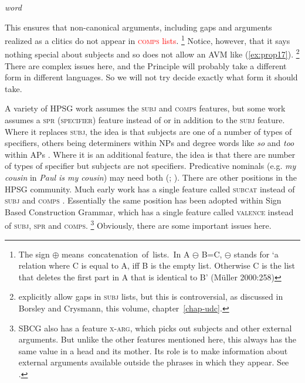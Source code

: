 \documentclass[output=paper
	        ,collection
	        ,collectionchapter
 	        ,biblatex
                ,babelshorthands
                ,newtxmath
                ,draftmode
                ,colorlinks, citecolor=brown
]{langscibook}
\begin{document}
\ea\label{ex:prop20}
\emph{word} \impl
{}
\z

This ensures that non-canonical arguments, including gaps and arguments realized as a clitics do not appear in \textcolor{red}{\textsc{comps} lists}.%
%
\footnote{The sign $\oplus$ means\ concatenation\ of\ lists.\ In A $\ominus$ B=C, $\ominus$ stands for ‘a relation where C is equal to A, iff B is the empty list. Otherwise C is the list that deletes the first part in A that is identical to B’ (Müller 2000:258)}
%
Notice, however, that it says nothing special about subjects and so does not allow an AVM like (\ref{ex:prop17}).%
%
\footnote{\citet[177--183]{GSag2000a-u} explicitly allow gaps in \textsc{subj} lists, but this is controversial, as discussed in Borsley and Crysmann, this volume, chapter~\ref{chap-udc}.}
%
There are complex issues here, and the Principle will probably take a different form in different languages. So we will not try decide exactly what form it should take.

A variety of HPSG work assumes the \textsc{subj} and \textsc{comps} features, but some work assumes a \textsc{spr (specifier)} feature instead of or in addition to the \textsc{subj} feature. Where it replaces \textsc{subj}, the idea is that subjects are one of a number of types of specifiers, others being determiners within NPs and degree words like \emph{so} and \emph{too} within APs \citep{SWB2003a}. Where it is an additional feature, the idea is that there are number of types of specifier but subjects are not specifiers. Predicative nominals (e.g. \emph{my cousin} in \emph{Paul is my cousin}) may need both (\citealp[9.4.1]{ps2}; \citealp[409]{GSag2000a-u}\citealp{AG2003a-b}). There are other positions in the HPSG community. Much early work has a single feature called \textsc{subcat} instead of \textsc{subj} and \textsc{comps} \citep{ps}. Essentially the same position has been adopted within Sign Based Construction Grammar, which has a single feature called \textsc{valence} instead of \textsc{subj, spr} and \textsc{comps}.%
%
\footnote{SBCG also has a feature \textsc{x-arg}, which picks out subjects and other external arguments. But unlike the other features mentioned here, this always has the same value in a head and its mother. Its role is to make information about external arguments available outside the phrases in which they appear.  See \citet[84, 149--151]{Sag2007a,Sag2012a}.}
%
Obviously, there are some important issues here.
\end{document}
